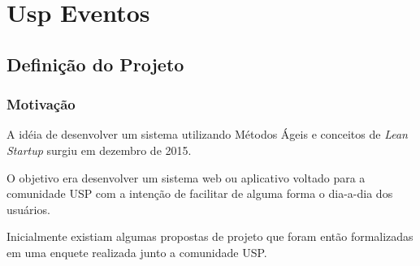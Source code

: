 \chapter{Usp Eventos}
\label{cap:uspeventos}
\section{Definição do Projeto}
\subsection{Motivação}
        \par A idéia de desenvolver um sistema utilizando Métodos Ágeis e conceitos de \emph{Lean Startup} surgiu em dezembro de 2015.
	\par O objetivo era desenvolver um sistema web ou aplicativo voltado para a comunidade USP com a intenção de facilitar de alguma forma o dia-a-dia dos usuários.
        \par Inicialmente existiam algumas propostas de projeto que foram então formalizadas em uma enquete realizada junto a comunidade USP.
